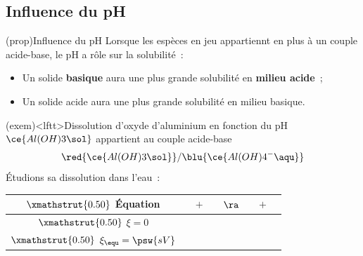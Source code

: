 \documentclass[../../main/main.tex]{subfiles}
\begin{document}
\subsection{Influence du pH}
\begin{tcb*}(prop){Influence du pH}
	Lorsque les espèces en jeu appartiennt en plus à un couple acide-base, le pH a
	rôle sur la solubilité~:
	\begin{itemize}
		\item Un solide \textbf{basique} aura une plus grande solubilité en
		      \textbf{milieu acide}~;
		\item Un solide acide aura une plus grande solubilité en milieu basique.
	\end{itemize}
\end{tcb*}
\begin{tcb*}(exem)<lftt>{Dissolution d'oxyde d'aluminium en fonction du pH}
	$\ce{Al(OH)3\sol}$ appartient au couple acide-base
	\[
		\red{\ce{Al(OH)3\sol}}/\blu{\ce{Al(OH)4^-\aqu}}
	\]
	Étudions sa dissolution dans l'eau~:
	\smallbreak
	\noindent
	\begin{minipage}[c]{.69\linewidth}
		\begin{center}
			\def\rhgt{0.50}
			\centering
			\begin{tabularx}{\linewidth}{|c||YdYdYdY|}
				\hline
				$\xmathstrut{\rhgt}$ \textbf{Équation} &
				               & $+$    &
				                  & $\ra$  &
				             & $+$    &
				                               \\
				\hline
				$\xmathstrut{\rhgt}$
				$\xi = 0$                              &
				                              & \vline &
				                            & \vline &
				                              & \vline &
				                              \\
				\hline
				$\xmathstrut{\rhgt}$
				$\xi_{\equ} = \psw{sV}$                &
				                         & \vline &
				                            & \vline &
				                             & \vline &
				                                \\
				\hline
			\end{tabularx}
		\end{center}
		\vspace{-15pt}
\end{minipage}
\end{tcb*}
\end{document}

